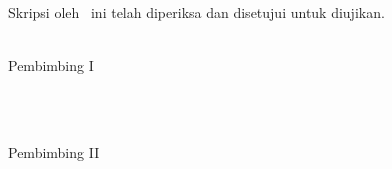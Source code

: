 %
%

\clearpage
\thispagestyle{empty}

Skripsi oleh \penulis\ ini telah diperiksa dan disetujui untuk diujikan.

\vspace{2\baselineskip}

\noindent \kotatanggal \\
Pembimbing I

\vspace{4\baselineskip}

\noindent \pembimbingSatu \\
\nipSatu

\vspace{2\baselineskip}

\noindent \kotatanggal \\
Pembimbing II

\vspace{4\baselineskip}

\noindent \pembimbingDua \\
\nipDua

\clearpage
